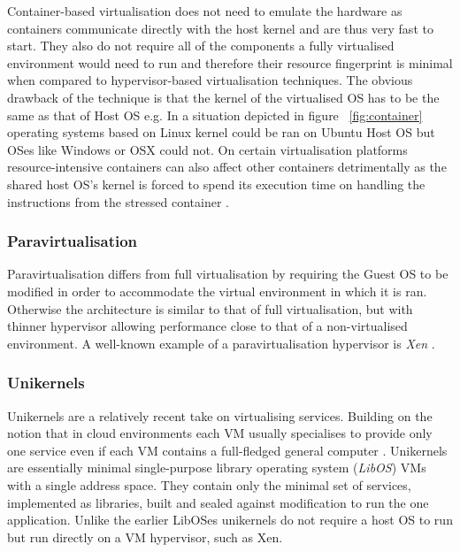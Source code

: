 
Container-based virtualisation does not need to emulate the hardware as containers communicate directly with the host kernel \cite{eder2016hypervisor} and are thus very fast to start. They also do not require all of the components a fully virtualised environment would need to run and therefore their resource fingerprint is minimal when compared to hypervisor-based virtualisation techniques. \linebreak
The obvious drawback of the technique is that the kernel of the virtualised OS has to be the same as that of Host OS e.g. In a situation depicted in figure ~\ref{fig:container} operating systems based on Linux kernel could be ran on Ubuntu Host OS but OSes like Windows or OSX could not. On certain virtualisation platforms resource-intensive containers can also affect other containers detrimentally as the shared host OS's kernel is forced to spend its execution time on handling the instructions from the stressed container \cite{Xaviercontainer}.


\subsubsection{Paravirtualisation}

Paravirtualisation differs from full virtualisation by requiring the Guest OS to be modified in order to accommodate the virtual environment in which it is ran. Otherwise the architecture is similar to that of full virtualisation, but with thinner hypervisor allowing performance close to that of a non-virtualised environment. A well-known example of a paravirtualisation hypervisor is \textit{Xen} \cite{xen}.

\subsubsection{Unikernels}

Unikernels are a relatively recent take on virtualising services. Building on the notion that in cloud environments each VM usually specialises to provide only one service even if each VM contains a full-fledged general computer \cite{unikernels}. Unikernels are essentially minimal single-purpose library operating system (\textit{LibOS})\cite{libos} VMs with a single address space. They contain only the minimal set of services, implemented as libraries, built and sealed against modification to run the one application. Unlike the earlier LibOSes unikernels do not require a host OS to run but run directly on a VM hypervisor, such as Xen.

